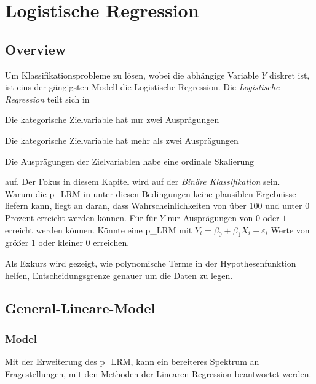 \section{Logistische Regression} \label{ref: Kapitel Logistische Regression} 
\subsection{Overview}
Um Klassifikationsprobleme zu lösen, wobei die abhängige Variable $Y$ diskret ist, ist eins der gängigsten Modell die Logistische Regression. Die \textit{Logistische Regression} teilt sich in 
\begin{description} \centering
	\item[Binare] Die kategorische Zielvariable hat nur zwei Ausprägungen
	\item[Multinomial] Die kategorische Zielvariable hat mehr als zwei Ausprägungen
	\item[Ordinal] Die Ausprägungen der Zielvariablen habe eine ordinale Skalierung
\end{description} auf. Der Fokus in diesem Kapitel wird auf der \textit{Binäre Klassifikation} sein.\\

Warum die \gls{p_LRM} in unter diesen Bedingungen keine plausiblen Ergebnisse liefern kann, liegt an daran, dass Wahrscheinlichkeiten von über 100 und unter 0 Prozent erreicht werden können. Für für $Y$ nur Ausprägungen von $0$ oder $1$ erreicht werden können. Könnte eine \gls{p_LRM} mit $Y_i = \beta_0 + \beta_1 X_i + \varepsilon_i$ Werte von größer $1$ oder kleiner $0$ erreichen. 

Als Exkurs wird gezeigt, wie polynomische Terme in der Hypothesenfunktion helfen, Entscheidungsgrenze genauer um die Daten zu legen.

\subsection{General-Lineare-Model}
\subsubsection{Model}
Mit der Erweiterung des \gls{p_LRM}, kann ein bereiteres Spektrum an Fragestellungen, mit den Methoden der Linearen Regression beantwortet werden. 

